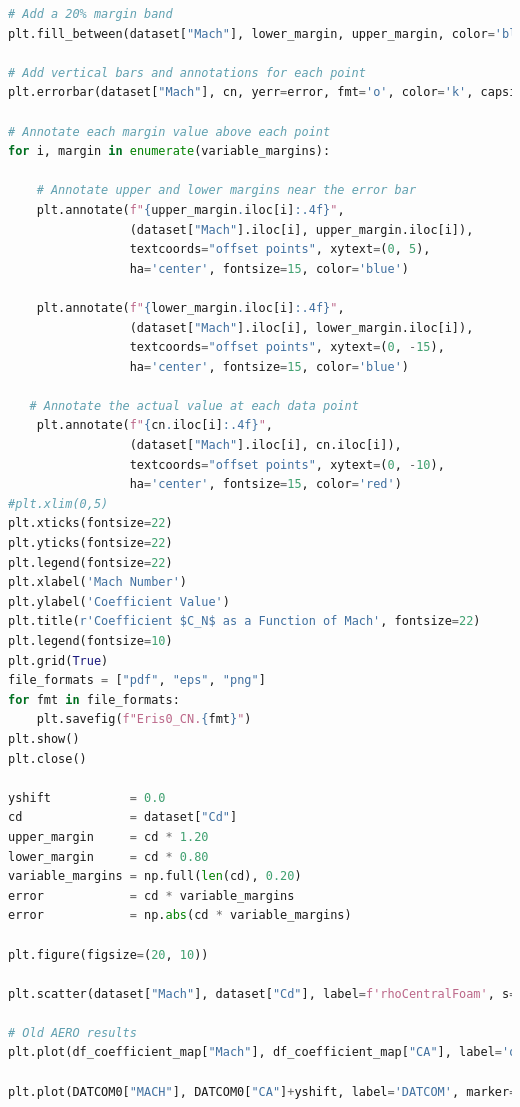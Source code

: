 \documentclass[12pt]{article}
\begin{document}
\begin{lstlisting}[language=Python, caption=Python script used to post-process numerical solutions. To report bugs email to: lorenzo.campoli@gspace.com, label=lst:pp]
# Add a 20% margin band
plt.fill_between(dataset["Mach"], lower_margin, upper_margin, color='blue', alpha=0.2, label='20% Margin Band')

# Add vertical bars and annotations for each point
plt.errorbar(dataset["Mach"], cn, yerr=error, fmt='o', color='k', capsize=10, label='Local Margin')

# Annotate each margin value above each point
for i, margin in enumerate(variable_margins):

    # Annotate upper and lower margins near the error bar
    plt.annotate(f"{upper_margin.iloc[i]:.4f}", 
                 (dataset["Mach"].iloc[i], upper_margin.iloc[i]), 
                 textcoords="offset points", xytext=(0, 5),
                 ha='center', fontsize=15, color='blue')
    
    plt.annotate(f"{lower_margin.iloc[i]:.4f}", 
                 (dataset["Mach"].iloc[i], lower_margin.iloc[i]), 
                 textcoords="offset points", xytext=(0, -15),
                 ha='center', fontsize=15, color='blue')

   # Annotate the actual value at each data point
    plt.annotate(f"{cn.iloc[i]:.4f}", 
                 (dataset["Mach"].iloc[i], cn.iloc[i]), 
                 textcoords="offset points", xytext=(0, -10),
                 ha='center', fontsize=15, color='red')
#plt.xlim(0,5)
plt.xticks(fontsize=22)
plt.yticks(fontsize=22)
plt.legend(fontsize=22)
plt.xlabel('Mach Number')
plt.ylabel('Coefficient Value')
plt.title(r'Coefficient $C_N$ as a Function of Mach', fontsize=22)
plt.legend(fontsize=10)
plt.grid(True)
file_formats = ["pdf", "eps", "png"]
for fmt in file_formats:
    plt.savefig(f"Eris0_CN.{fmt}")
plt.show()
plt.close()

yshift           = 0.0
cd               = dataset["Cd"]
upper_margin     = cd * 1.20 
lower_margin     = cd * 0.80 
variable_margins = np.full(len(cd), 0.20)
error            = cd * variable_margins
error            = np.abs(cd * variable_margins) 

plt.figure(figsize=(20, 10))

plt.scatter(dataset["Mach"], dataset["Cd"], label=f'rhoCentralFoam', s=200, marker='p', color='r', linestyle='dotted')

# Old AERO results
plt.plot(df_coefficient_map["Mach"], df_coefficient_map["CA"], label='old AERO', marker='p', linestyle=':', color='lime')

plt.plot(DATCOM0["MACH"], DATCOM0["CA"]+yshift, label='DATCOM', marker='p', linestyle=':', color='gray')


\end{lstlisting}
\end{document}
